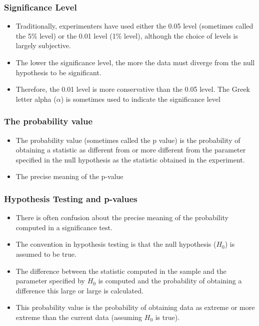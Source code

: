 ﻿\documentclass[a4]{beamer}
\begin{document}
\begin{frame}
\frametitle{Significance Level}

\begin{itemize}
\item Traditionally, experimenters have used either the 0.05 level (sometimes called the 5\% level) or the 0.01 level (1\% level), although the choice of levels is largely subjective. \item The lower the significance level, the more the data must diverge from the null hypothesis to be significant. \item Therefore, the 0.01 level is more conservative than the 0.05 level. The Greek letter alpha ($\alpha$) is sometimes used to indicate the significance level \end{itemize}
\end{frame}
\begin{frame}
\frametitle{The probability value }
\begin{itemize}
\item The probability value (sometimes called the p value) is the probability of obtaining a statistic as different from or more different from the parameter specified in the null hypothesis as the statistic obtained in the experiment. 
\item The precise meaning of the p-value
\end{itemize}
\end{frame}



\begin{frame}
\frametitle{Hypothesis Testing and p-values}
\begin{itemize}
\item There is often confusion about the precise meaning of the probability computed in a significance test.\item  The convention in hypothesis testing is that the null hypothesis ($H_0$) is assumed to be true. 

\item 
The difference between the statistic computed in the sample and the parameter specified by $H_0$ is computed and the probability of obtaining a difference this large or large is calculated. \item This probability value is the probability of obtaining data as extreme or more extreme than the current data (assuming $H_0$ is true). 
\end{itemize}

\end{frame}
\end{document}
